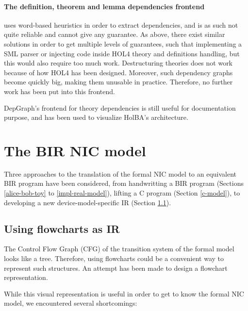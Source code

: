\documentclass[10pt,a4paper]{article}
\begin{document}
\begin{multicols}{2}
\paragraph{The definition, theorem and lemma dependencies frontend} uses word-based heuristics in order to extract dependencies, and is as such not quite reliable and cannot give any guarantee. As above, there exist similar solutions in order to get multiple levels of guarantees, such that implementing a SML parser or injecting code inside HOL4 theory and definitions handling, but this would also require too much work. Destructuring theories does not work because of how HOL4 has been designed. Moreover, such dependency graphs become quickly big, making them unusable in practice. Therefore, no further work has been put into this frontend.

DepGraph's frontend for theory dependencies is still useful for documentation purpose, and has been used to visualize HolBA's architecture.


\section{The BIR NIC model} \label{nic-model}

Three approaches to the translation of the formal NIC model to an equivalent BIR program have been considered, from handwritting a BIR program (Sections \ref{alice-bob-toy} to \ref{impl-real-model}), lifting a C program (Section \ref{c-model}), to developing a new device-model-specific IR (Section \ref{flowchart-attempt}).

\subsection{Using flowcharts as IR} \label{flowchart-attempt}

The Control Flow Graph ({CFG}) of the transition system of the formal model looks like a tree. Therefore, using flowcharts could be a convenient way to represent such structures. An attempt has been made to design a flowchart representation.

While this visual representation is useful in order to get to know the formal NIC model, we encountered several shortcomings:


\end{multicols}
\end{document}
